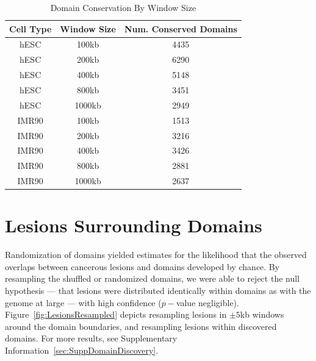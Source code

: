 \begin{table}
  \centering
  \caption{Domain Conservation By Window Size}\label{tab:conservedDomains}
  \begin{tabularx}{0.75\textwidth}{@{}ccc@{}}
    \toprule
    Cell Type & Window Size & Num. Conserved Domains \\
    \midrule
     hESC  & 100kb  & 4435 \\
     hESC  & 200kb  & 6290 \\
     hESC  & 400kb  & 5148 \\
     hESC  & 800kb  & 3451 \\
     hESC  & 1000kb & 2949 \\
     IMR90 & 100kb  & 1513 \\
     IMR90 & 200kb  & 3216 \\
     IMR90 & 400kb  & 3426 \\
     IMR90 & 800kb  & 2881 \\
     IMR90 & 1000kb & 2637 \\
    \bottomrule
  \end{tabularx}
\end{table}

\section*{Lesions Surrounding Domains}

Randomization of domains yielded estimates for the likelihood that the observed overlaps between cancerous lesions and domains
developed by chance.  By resampling the shuffled or randomized domains, we were able to reject the null hypothesis --- that lesions
were distributed identically within domains as with the genome at large --- with high confidence ($p-$value negligible).
Figure~\ref{fig:LesionsResampled} depicts resampling lesions in $\pm5$kb windows around the domain boundaries, and resampling lesions
within discovered domains.  For more results, see Supplementary Information~\ref{sec:SuppDomainDiscovery}.

